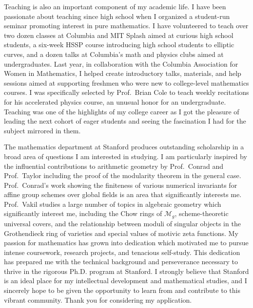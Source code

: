 \documentclass[11pt]{article}
\begin{document}
Teaching is also an important component of my academic life. I have been passionate about teaching since high school when I organized a student-run seminar promoting interest in pure mathematics. I have volunteered to teach over two dozen classes at Columbia and MIT Splash aimed at curious high school students, a six-week HSSP course introducing high school students to elliptic curves, and a dozen talks at Columbia's math and physics clubs aimed at undergraduates. Last year, in collaboration with the Columbia Association for Women in Mathematics, I helped create introductory talks, materials, and help sessions aimed at supporting freshmen who were new to college-level mathematics courses. I was specifically selected by Prof.\ Brian Cole to teach weekly recitations for his accelerated physics course, an unusual honor for an undergraduate. Teaching was one of the highlights of my college career as I got the pleasure of leading the next cohort of eager students and seeing the fascination I had for the subject mirrored in them.
\par
The mathematics department at Stanford produces outstanding scholarship in a broad area of questions I am interested in studying. I am particularly inspired by the influential contributions to arithmetic geometry by Prof.\ Conrad and Prof.\ Taylor including the proof of the modularity theorem in the general case. Prof.\ Conrad’s work showing the finiteness of various numerical invariants for affine group schemes over global fields is an area that significantly interests me. Prof.\ Vakil studies a large number of topics in algebraic geometry which significantly interest me, including the Chow rings of $\mathcal{M}_g$, scheme-theoretic universal covers, and the relationship between moduli of singular objects in the Grothendieck ring of varieties and special values of motivic zeta functions. My passion for mathematics has grown into dedication which motivated me to pursue intense coursework, research projects, and tenacious self-study. This dedication has prepared me with the technical background and perseverance necessary to thrive in the rigorous Ph.D. program at Stanford. I strongly believe that Stanford is an ideal place for my intellectual development and mathematical studies, and I sincerely hope to be given the opportunity to learn from and contribute to this vibrant community. Thank you for considering my application.
\end{document}
